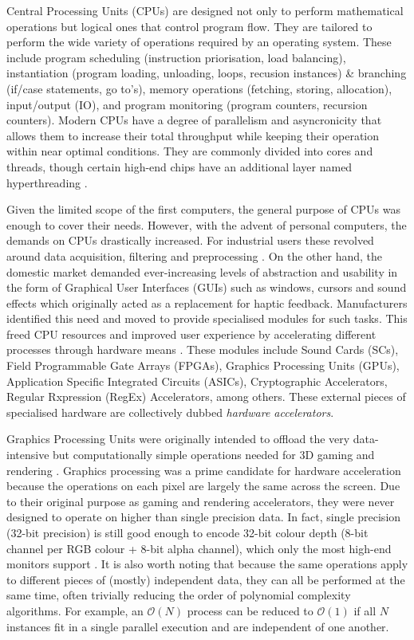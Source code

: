 Central Processing Units (CPUs) are designed not only to perform mathematical operations but logical ones that control program flow. They are tailored to perform the wide variety of operations required by an operating system. These include program scheduling (instruction priorisation, load balancing), instantiation (program loading, unloading, loops, recusion instances) \& branching (if/case statements, go to's), memory operations (fetching, storing, allocation), input/output (IO), and program monitoring (program counters, recursion counters). Modern CPUs have a degree of parallelism and asyncronicity that allows them to increase their total throughput while keeping their operation within near optimal conditions. They are commonly divided into cores and threads, though certain high-end chips have an additional layer named hyperthreading \cite{cpu_arch}.

Given the limited scope of the first computers, the general purpose of CPUs was enough to cover their needs. However, with the advent of personal computers, the demands on CPUs drastically increased. For industrial users these revolved around data acquisition, filtering and preprocessing \cite{fpga, preproc, filtering}. On the other hand, the domestic market demanded ever-increasing levels of abstraction and usability in the form of Graphical User Interfaces (GUIs) such as windows, cursors and sound effects which originally acted as a replacement for haptic feedback. Manufacturers identified this need and moved to provide specialised modules for such tasks. This freed CPU resources and improved user experience by accelerating different processes through hardware means \cite{gpu1, gpu2, gpu3, sound}. These modules include Sound Cards (SCs), Field Programmable Gate Arrays (FPGAs), Graphics Processing Units (GPUs), Application Specific Integrated Circuits (ASICs), Cryptographic Accelerators, Regular Rxpression (RegEx) Accelerators, among others. These external pieces of specialised hardware are collectively dubbed \emph{hardware accelerators}.

Graphics Processing Units were originally intended to offload the very data-intensive but computationally simple operations needed for 3D gaming and rendering \cite{gpu1, gpu2, gpu3}. Graphics processing was a prime candidate for hardware acceleration because the operations on each pixel are largely the same across the screen. Due to their original purpose as gaming and rendering accelerators, they were never designed to operate on higher than single precision data. In fact, single precision (32-bit precision) is still good enough to encode 32-bit colour depth (8-bit channel per RGB colour + 8-bit alpha channel), which only the most high-end monitors support \cite{monitor}. It is also worth noting that because the same operations apply to different pieces of (mostly) independent data, they can all be performed at the same time, often trivially reducing the order of polynomial complexity algorithms. For example, an $\mathcal{O}(N)$ process can be reduced to $\mathcal{O}(1)$ if all $N$ instances fit in a single parallel execution and are independent of one another.

